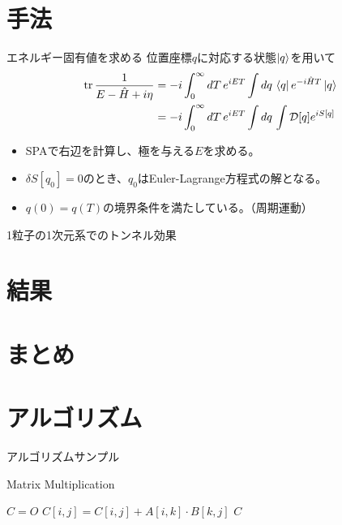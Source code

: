 \documentclass[14pt,aspectratio=169,xcolor=dvipsnames,table,dvipdfmx]{beamer}
\theoremstyle{definition}
\begin{document}
\section{手法}
\begin{frame}{エネルギー固有値を求める}
  位置座標$q$に対応する状態$\ket{q}$を用いて
  \begin{align*}
    \trace\frac{1}{E-\hat{H}+i\eta} & =-i\int_0^{\infty}dT\,e^{iET}\int dq\,\bra{q}e^{-i\hat{H}T}\ket{q} \\
                                    & = -i\int_0^{\infty}dT\,e^{iET}\int dq\,\int\mathcal{D}[q]e^{iS[q]}
  \end{align*}
  \begin{itemize}
    \item SPAで右辺を計算し、極を与える$E$を求める。
    \item $\delta S[q_0]=0$のとき、$q_0$はEuler-Lagrange方程式の解となる。
    \item $q(0)=q(T)$の境界条件を満たしている。（周期運動）
  \end{itemize}



\end{frame}
\begin{frame}{1粒子の1次元系でのトンネル効果}

\end{frame}

\section{結果}

\section{まとめ}

\section{アルゴリズム}
\begin{frame}{アルゴリズムサンプル}
  \begin{block}{Matrix Multiplication}
    \begin{algorithmic}[1]
      \STATE $C = O$
      \STATE $C[i,j] = C[i,j] + A[i, k] \cdot B[k, j]$
      \ENDFOR
      \ENDFOR
      \ENDFOR
      \RETURN $C$
    \end{algorithmic}
  \end{block}
\end{frame}
\end{document}
